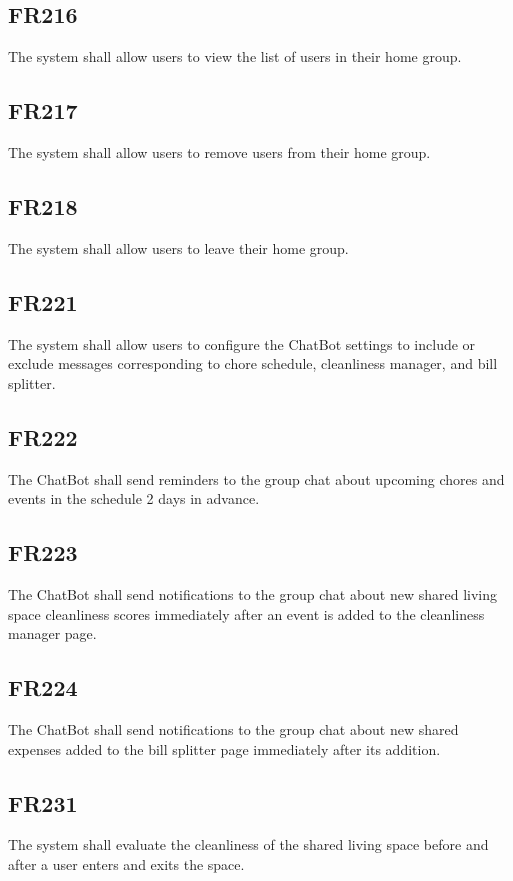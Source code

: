 \documentclass[12pt, titlepage]{article}
\begin{document}
\subsection{FR216}
The system shall allow users to view the list of users in their home group.

\subsection{FR217}
The system shall allow users to remove users from their home
group.

\subsection{FR218}
The system shall allow users to leave their home group.

\subsection{FR221}
The system shall allow users to configure the ChatBot settings to
include or exclude messages corresponding to chore schedule, cleanliness
manager, and bill splitter.

\subsection{FR222}
The ChatBot shall send reminders to the group chat about
upcoming chores and events in the schedule 2 days in advance.

\subsection{FR223}
The ChatBot shall send notifications to the group chat about new
shared living space cleanliness scores immediately after an event is added to
the cleanliness manager page.

\subsection{FR224}
The ChatBot shall send notifications to the group chat about new
shared expenses added to the bill splitter page immediately after its
addition.

\subsection{FR231}
The system shall evaluate the cleanliness of the shared living space before and after a user enters and exits the space.
\end{document}
